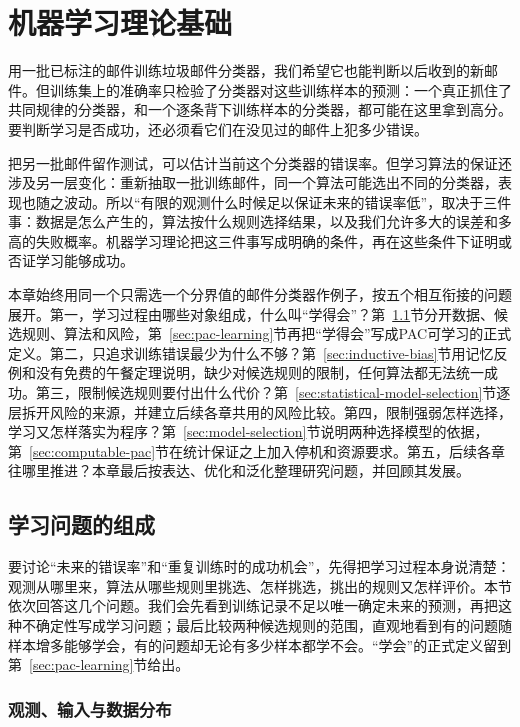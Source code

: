 \chapter{机器学习理论基础}
\label{chap:statistical-learning-framework}

用一批已标注的邮件训练垃圾邮件分类器，我们希望它也能判断以后收到的新邮件。但训练集上的准确率只检验了分类器对这些训练样本的预测：一个真正抓住了共同规律的分类器，和一个逐条背下训练样本的分类器，都可能在这里拿到高分。要判断学习是否成功，还必须看它们在没见过的邮件上犯多少错误。

把另一批邮件留作测试，可以估计当前这个分类器的错误率。但学习算法的保证还涉及另一层变化：重新抽取一批训练邮件，同一个算法可能选出不同的分类器，表现也随之波动。所以“有限的观测什么时候足以保证未来的错误率低”，取决于三件事：数据是怎么产生的，算法按什么规则选择结果，以及我们允许多大的误差和多高的失败概率。机器学习理论把这三件事写成明确的条件，再在这些条件下证明或否证学习能够成功。

本章始终用同一个只需选一个分界值的邮件分类器作例子，按五个相互衔接的问题展开。第一，学习过程由哪些对象组成，什么叫“学得会”？第~\ref{sec:learning-problem}节分开数据、候选规则、算法和风险，第~\ref{sec:pac-learning}节再把“学得会”写成PAC可学习的正式定义。第二，只追求训练错误最少为什么不够？第~\ref{sec:inductive-bias}节用记忆反例和没有免费的午餐定理说明，缺少对候选规则的限制，任何算法都无法统一成功。第三，限制候选规则要付出什么代价？第~\ref{sec:statistical-model-selection}节逐层拆开风险的来源，并建立后续各章共用的风险比较。第四，限制强弱怎样选择，学习又怎样落实为程序？第~\ref{sec:model-selection}节说明两种选择模型的依据，第~\ref{sec:computable-pac}节在统计保证之上加入停机和资源要求。第五，后续各章往哪里推进？本章最后按表达、优化和泛化整理研究问题，并回顾其发展。

\section{学习问题的组成}
\label{sec:learning-problem}
\label{sec:statistical-learning-problem}

要讨论“未来的错误率”和“重复训练时的成功机会”，先得把学习过程本身说清楚：观测从哪里来，算法从哪些规则里挑选、怎样挑选，挑出的规则又怎样评价。本节依次回答这几个问题。我们会先看到训练记录不足以唯一确定未来的预测，再把这种不确定性写成学习问题；最后比较两种候选规则的范围，直观地看到有的问题随样本增多能够学会，有的问题却无论有多少样本都学不会。“学会”的正式定义留到第~\ref{sec:pac-learning}节给出。

\subsection{观测、输入与数据分布}
\label{sec:learning-problem-data}

